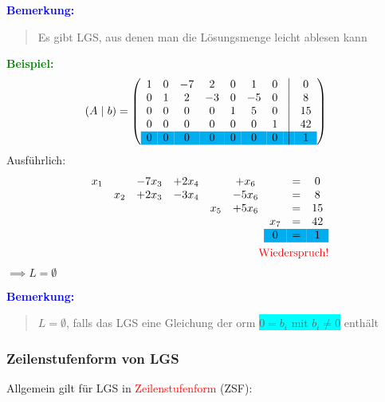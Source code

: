 \documentclass{article}
\newcommand{\smsp}{\phantom{\hspace{3px}}}
\newcommand{\red}[1]{\textcolor{red}{#1}}
\newcommand{\blue}[1]{\textcolor{blue}{#1}}
\newcommand{\green}[1]{\textcolor{green}{#1}}
\newcommand{\hcyan}[1]{\colorbox{cyan}{#1}}
\newcommand{\ex}{\green{\textbf{Beispiel: }}}
\newcommand{\an}[1]{\blue{\textbf{Bemerkung: }}\begin{quote}#1\end{quote}}
\renewcommand{\st}{\smsp | \smsp}
\begin{document}
\an{
    Es gibt LGS, aus denen man die Lösungsmenge leicht ablesen kann
}
\ex
\begin{equation*}
    (A \st b) =
    \left(
        \begin{array}{ccccccccc}
            1 & 0 & -7 & 2 & 0 & 1 & 0 & \vline & 0\\
            0 & 1 & 2 & -3 & 0 & -5 & 0 & \vline & 8\\
            0 & 0 & 0 & 0 & 1 & 5 & 0 & \vline & 15\\
            0 & 0 & 0 & 0 & 0 & 0 & 1 & \vline & 42\\
            \rowcolor{cyan}
            0 & 0 & 0 & 0 & 0 & 0 & 0 & \vline & 1
        \end{array}
    \right)\\
\end{equation*}
Ausführlich:
\begin{equation*}
    \begin{split}
        \begin{array}{ccccccccc}
            x_1 &     & -7x_3 & +2x_4 &     & +x_6   &     & = & 0\\
                & x_2 & +2x_3 & -3x_4 &     & -5x_6  &     & = & 8\\
                &     &       &       & x_5 & +5 x_6 &     & = & 15\\
                &     &       &       &     &        & x_7 & = & 42\\
            &&&&&& \cellcolor{cyan}{0} & \cellcolor{cyan}{=} & \cellcolor{cyan}{1}
        \end{array}\\
        \text{\red{Wiederspruch!}}
    \end{split}
\end{equation*}
$\implies L = \emptyset$

\an{
    $L = \emptyset$, falls das LGS eine Gleichung der orm \hcyan{$0 = b_i$ mit $b_i \neq 0$} enthält
}

\newpage
\subsubsection{Zeilenstufenform von LGS}

Allgemein gilt für LGS in \red{Zeilenstufenform} (ZSF):
\end{document}
